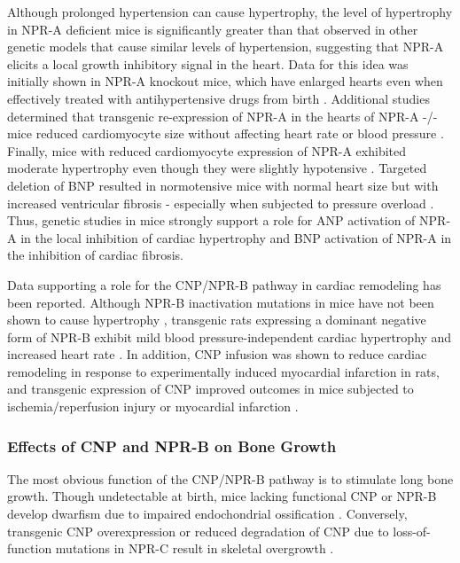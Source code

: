 \documentclass[14pt,a4paper,onecolumn]{extarticle}
\begin{document}
Although prolonged hypertension can cause hypertrophy, the level of hypertrophy in NPR-A deficient mice is significantly greater than that observed in other genetic models that cause similar levels of hypertension, suggesting that NPR-A elicits a local growth inhibitory signal in the heart. Data for this idea was initially shown in NPR-A knockout mice, which have enlarged hearts even when effectively treated with antihypertensive drugs from birth \citep{Knowles2001}. Additional studies determined that transgenic re-expression of NPR-A in the hearts of NPR-A -/- mice reduced cardiomyocyte size without affecting heart rate or blood pressure \citep{Kishimoto2001}.
Finally, mice with reduced cardiomyocyte expression of NPR-A exhibited moderate hypertrophy even though they were slightly hypotensive \citep{Holtwick2003} \citep{Patel2005}. Targeted deletion of BNP resulted in normotensive mice with normal heart size but with increased ventricular fibrosis - especially when subjected to pressure overload \citep{Tamura2000}. Thus, genetic studies in mice strongly support a role for ANP activation of NPR-A in the local inhibition of cardiac hypertrophy and BNP activation of NPR-A in the inhibition of cardiac fibrosis.

Data supporting a role for the CNP/NPR-B pathway in cardiac remodeling has been reported. Although NPR-B inactivation mutations in mice have not been shown to cause hypertrophy \citep{Tamura2004} \citep{Tsuji2005}, transgenic rats expressing a dominant negative form of NPR-B exhibit mild blood pressure-independent cardiac hypertrophy and increased heart rate \citep{Langenickel2006}.
In addition, CNP infusion was shown to reduce cardiac remodeling in response to experimentally induced myocardial infarction in rats, and transgenic expression of CNP improved outcomes in mice subjected to ischemia/reperfusion injury or myocardial infarction \citep{Wang2007}.

\subsubsection{Effects of CNP and NPR-B on Bone Growth}
The most obvious function of the CNP/NPR-B pathway is to stimulate long bone growth. Though undetectable at birth, mice lacking functional CNP or NPR-B develop dwarfism due to impaired endochondrial ossification \citep{Tsuji2005}.
Conversely, transgenic CNP overexpression or reduced degradation of CNP due to loss-of-function mutations in NPR-C result in skeletal overgrowth \citep{Yasoda2004}.
\end{document}
